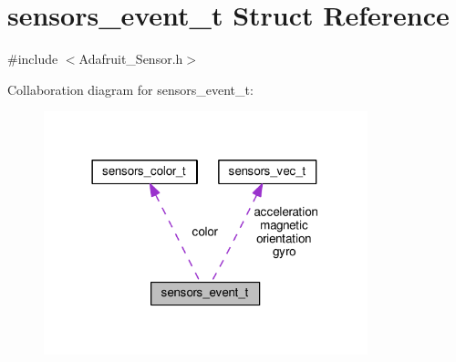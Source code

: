 \hypertarget{structsensors__event__t}{}\section{sensors\+\_\+event\+\_\+t Struct Reference}
\label{structsensors__event__t}


{\ttfamily \#include $<$Adafruit\+\_\+\+Sensor.\+h$>$}



Collaboration diagram for sensors\+\_\+event\+\_\+t\+:\nopagebreak
\begin{figure}[H]
\begin{center}
\leavevmode
\includegraphics[width=266pt]{structsensors__event__t__coll__graph}
\end{center}
\end{figure}
